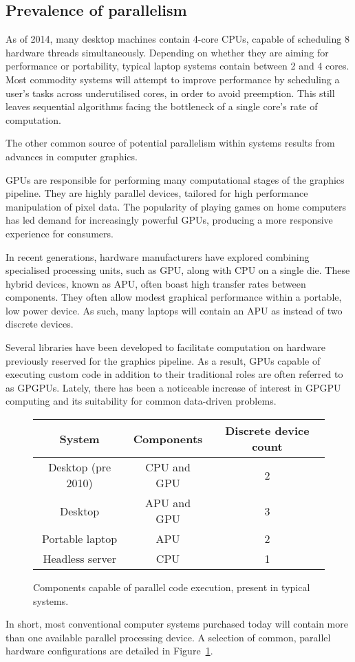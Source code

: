 \subsection{Prevalence of parallelism}
As of 2014, many desktop machines contain 4-core \acp{CPU}, capable of scheduling 8 hardware threads simultaneously.
Depending on whether they are aiming for performance or portability, typical laptop systems contain between 2 and 4 cores.
Most commodity systems will attempt to improve performance by scheduling a user's tasks across underutilised cores, in order to avoid preemption. This still leaves sequential algorithms facing the bottleneck of a single core's rate of computation.

The other common source of potential parallelism within systems results from advances in computer graphics.

\acp{GPU} are responsible for performing many computational stages of the graphics pipeline. They are highly parallel devices, tailored for high performance manipulation of pixel data. The popularity of playing games on home computers has led demand for increasingly powerful \acp{GPU}, producing a more responsive experience for consumers.

In recent generations, hardware manufacturers have explored combining specialised processing units, such as \ac{GPU}, along with \ac{CPU} on a single die. These hybrid devices, known as \ac{APU}, often boast high transfer rates between components. They often allow modest graphical performance within a portable, low power device. As such, many laptops will contain an \ac{APU} as instead of two discrete devices.

Several libraries have been developed to facilitate computation on hardware previously reserved for the graphics pipeline. As a result, \acp{GPU} capable of executing custom code in addition to their traditional roles are often referred to as \acp{GPGPU}.
Lately, there has been a noticeable increase of interest in \ac{GPGPU} computing and its suitability for common data-driven problems.

\begin{figure}
  \begin{tabular}{ | c | c | c |}
    \hline
    System & Components & Discrete device count \\ \hline
    Desktop (pre 2010) & \ac{CPU} and \ac{GPU} & 2 \\ \hline
    Desktop & \ac{APU} and \ac {GPU} & 3 \\ \hline
    Portable laptop & \ac{APU} & 2 \\ \hline
    Headless server & \ac{CPU} & 1 \\ \hline
    \end{tabular}
  \caption{Components capable of parallel code execution, present in typical systems.}
  \label{fig:par_table}
\end{figure}

In short, most conventional computer systems purchased today will contain more than one available parallel processing device. A selection of common, parallel hardware configurations are detailed in Figure~\ref{fig:par_table}.
